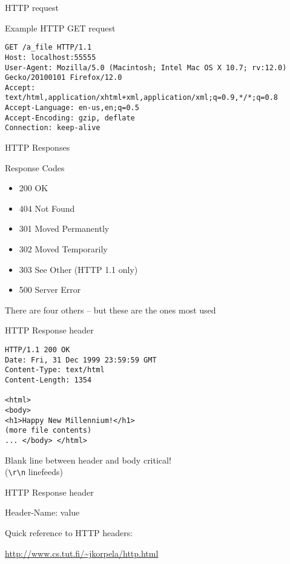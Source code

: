 \documentclass{beamer}
\begin{document}
\begin{frame}[fragile]{HTTP request}

{\Large Example HTTP GET request}
\begin{verbatim}
GET /a_file HTTP/1.1
Host: localhost:55555
User-Agent: Mozilla/5.0 (Macintosh; Intel Mac OS X 10.7; rv:12.0) Gecko/20100101 Firefox/12.0
Accept: text/html,application/xhtml+xml,application/xml;q=0.9,*/*;q=0.8
Accept-Language: en-us,en;q=0.5
Accept-Encoding: gzip, deflate
Connection: keep-alive
\end{verbatim}

\end{frame}

\begin{frame}{HTTP Responses}

{\Large Response Codes}

\begin{itemize}
\item 200 OK
\item 404 Not Found
\item 301 Moved Permanently
\item 302 Moved Temporarily
\item 303 See Other (HTTP 1.1 only)
\item 500 Server Error
\end{itemize}

\vfill
There are four others -- but these are the ones most used
\end{frame}

\begin{frame}[fragile]{HTTP Response header}

\begin{verbatim}
HTTP/1.1 200 OK
Date: Fri, 31 Dec 1999 23:59:59 GMT
Content-Type: text/html
Content-Length: 1354

<html>
<body>
<h1>Happy New Millennium!</h1>
(more file contents)
... </body> </html>
\end{verbatim}

\vfill
Blank line between header and body critical!\\
 \hspace{0.25in} (\verb|\r\n| linefeeds)
\end{frame}

\begin{frame}[fragile]{HTTP Response header}

{\Large Header-Name: value}

\vfill
{\Large Quick reference to HTTP headers:}

\vfill
\url{http://www.cs.tut.fi/~jkorpela/http.html}
\end{frame}
\end{document}
